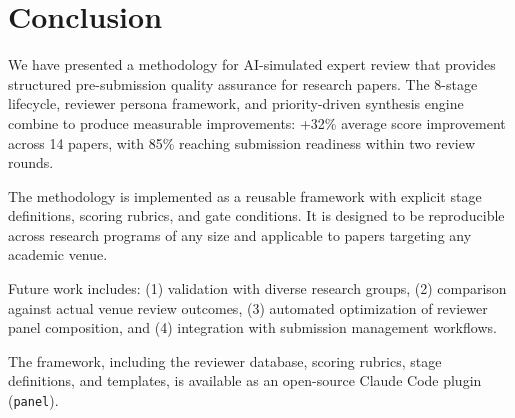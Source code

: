 \section{Conclusion}

We have presented a methodology for AI-simulated expert review that provides structured pre-submission quality assurance for research papers. The 8-stage lifecycle, reviewer persona framework, and priority-driven synthesis engine combine to produce measurable improvements: +32\% average score improvement across 14 papers, with 85\% reaching submission readiness within two review rounds.

The methodology is implemented as a reusable framework with explicit stage definitions, scoring rubrics, and gate conditions. It is designed to be reproducible across research programs of any size and applicable to papers targeting any academic venue.

Future work includes: (1) validation with diverse research groups, (2) comparison against actual venue review outcomes, (3) automated optimization of reviewer panel composition, and (4) integration with submission management workflows.

The framework, including the reviewer database, scoring rubrics, stage definitions, and templates, is available as an open-source Claude Code plugin (\texttt{panel}).
